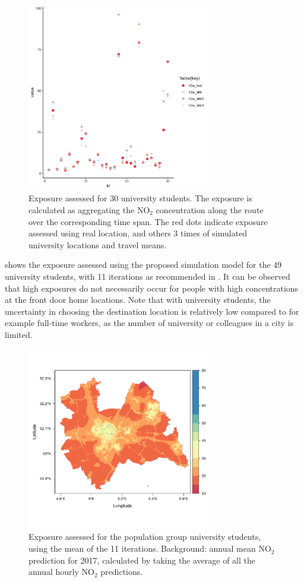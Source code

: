 \documentclass[]{article}
\begin{document}
\begin{figure}[h]
    \centering
    \includegraphics[width=8cm]{figure/sims.png}
    \caption{Exposure assessed for 30 university students. The exposure is calculated as aggregating the NO$_2$ concentration along the route over the corresponding time span. The red dots indicate exposure assessed using real location, and others 3 times of simulated university locations and travel means.}
    \label{sims}
\end{figure}


 shows the exposure assessed using the proposed simulation model for the 49 university students, with 11 iterations as recommended in \citep{lu2019activity}. It can be observed that high exposures do not necessarily occur for people with high concentrations at the front door home locations. Note that with university students, the uncertainty in choosing the destination location is relatively low compared to for example full-time workers, as the number of university or colleagues in a city is limited. 

\begin{figure}[h]
    \centering
    \includegraphics[width=8cm]{figure/utschoolmean2.pdf}
    \caption{Exposure assessed for the population group university students, using the mean of the 11 iterations.  Background: annual mean NO$_2$ prediction for 2017, calculated by taking the average of all the annual hourly NO$_2$ predictions.}
    \label{expmap}
\end{figure}
\end{document}
